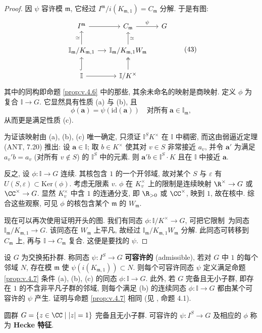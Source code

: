 \begin{proof}
因 $\psi$ 容许模 $\mathfrak{m}$, 它经过 $I^{\mathfrak{m}}/i(K_{\mathfrak{m},1})=C_{\mathfrak{m}}$ 分解. 于是有图:
\begin{equation}
\begin{tikzcd}[column sep=small]
I^{\mathfrak{m}}\ar[r] & C_{\mathfrak{m}}\ar[r, "\psi"] & G\\
\mathbb{I}_{\mathfrak{m}}/K_{\mathfrak{m},1}\ar[r]\ar[u, "\simeq"] & \mathbb{I}_{\mathfrak{m}}/K_{\mathfrak{m},1}W_{\mathfrak{m}}\ar[u, "\simeq"'] & \\
\mathbb{I}\ar[r]\ar[u, hookrightarrow] & \mathbb{I}/K^{\times}\ar[u, two heads] &
\end{tikzcd}\tag{43}
\end{equation}
其中的同构即命题 \ref{prop:v.4.6} 中的那些, 其余未命名的映射是商映射. 定义 $\phi$ 为复合 $\mathbb{I}\to G$. 它显然具有性质 (a) 与 (b), 且
\[
\phi(\mathbf{a})=\psi(\mathrm{id}(\mathbf{a}))\quad\text{对所有}\ \mathbf{a}\in\mathbb{I}_{\mathfrak{m}},
\]
从而更是满足性质 (c).

为证该映射由 (a), (b), (c) 唯一确定, 只须证 $\mathbb{I}^S K^{\times}$ 在 $\mathbb{I}$ 中稠密, 而这由弱逼近定理 (ANT, 7.20) 推出: 设 $\mathbf{a}\in\mathbb{I}$; 取 $b\in K^{\times}$ 使其对 $v\in S$ 非常接近 $a_v$, 并令 $\mathbf{a}'$ 为满足 $a_v'b=a_v$ (对所有 $v\notin S$) 的 $\mathbb{I}^S$ 中的元素. 则 $\mathbf{a}'b\in\mathbb{I}^S\cdot K$ 且在 $\mathbb{I}$ 中接近 $\mathbf{a}$.

反之, 设 $\phi\colon\mathbb{I}\to G$ 连续. 其核包含 $1$ 的一个开邻域, 故对某个 $S$ 与 $\varepsilon$ 有 $U(S,\varepsilon)\subset\mathrm{Ker}(\phi)$. 考虑无限素 $v$. $\phi$ 在 $K_v^{\times}$ 上的限制是连续映射 $\R^{\times}\to G$ 或 $\CC^{\times}\to G$. 显然 $K_v^{\times}$ 中含 $1$ 的连通分支, 即 $\R_{>0}$ 或 $\CC^{\times}$, 映到 $1$, 故在核中. 综合这些观察, 可见 $\phi$ 的核包含某个 $\mathfrak{m}$ 的 $W_{\mathfrak{m}}$.

现在可以再次使用证明开头的图. 我们有同态 $\phi\colon\mathbb{I}/K^{\times}\to G$, 可把它\guillemotleft 限制\guillemotright\ 为同态 $\mathbb{I}_{\mathfrak{m}}/K_{\mathfrak{m},1}\to G$. 该同态在 $W_{\mathfrak{m}}$ 上平凡, 故经过 $\mathbb{I}_{\mathfrak{m}}/K_{\mathfrak{m},1}W_{\mathfrak{m}}$ 分解. 此同态可转移到 $C_{\mathfrak{m}}$ 上, 再与 $\mathbb{I}\to C_{\mathfrak{m}}$ 复合. 这便是要找的 $\psi$.
\end{proof}

\begin{remark}\label{rem:v.4.8}
设 $G$ 为交换拓扑群. 称同态 $\psi\colon I^S\to G$ \textbf{可容许的} (admissible), 若对 $G$ 中 $1$ 的每个邻域 $N$, 存在模 $\mathfrak{m}$ 使 $\psi(i(K_{\mathfrak{m},1}))\subset N$. 则每个可容许同态 $\psi$ 定义满足命题 \ref{prop:v.4.7} 条件 (a), (b), (c) 的同态 $\phi\colon\mathbb{I}\to G$. 此外, 若 $G$ 完备且\guillemotleft 无小子群\guillemotright, 即存在 $1$ 的不含非平凡子群的邻域, 则每个满足 (b) 的连续同态 $\phi\colon\mathbb{I}\to G$ 都由某个可容许的 $\psi$ 产生. 证明与命题 \ref{prop:v.4.7} 相同 (见 \cite{Tate1967}, 命题 4.1).

圆群 $G=\{z\in\CC\mid|z|=1\}$ 完备且无小子群. 可容许的 $\psi\colon I^S\to G$ 及相应的 $\phi$ 称为 \textbf{Hecke 特征}.
\end{remark}

